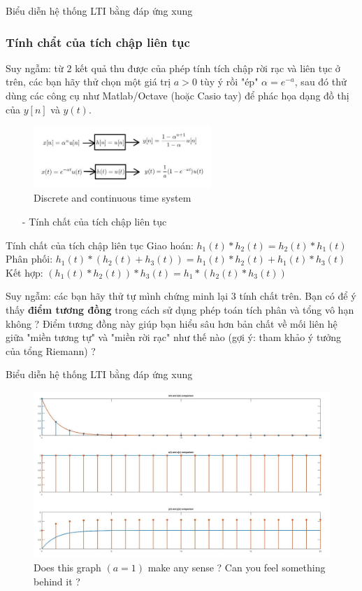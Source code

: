 \documentclass[8pt]{beamer}
\begin{document}
\begin{frame}{Biểu diễn hệ thống LTI bằng đáp ứng xung}
\subsubsection{Tính chẩt của tích chập liên tục}
Suy ngẫm: từ $2$ kết quả thu được của phép tính tích chập rời rạc và liên tục ở trên, các bạn hãy thử chọn một giá trị $a>0$ tùy ý rồi "ép" $\alpha=e^{-a}$, sau đó thử dùng các công cụ như Matlab/Octave (hoặc Casio tay) để phác họa dạng đồ thị của $y[n]$ và $y(t)$.

\begin{figure}[h]
			\includegraphics[width=0.6\textwidth]{result.jpg}
			\caption{Discrete and continuous time system}\label{fig:re9}
		\end{figure}
\begin{itemize}
	\item[-] Tính chất của tích chập liên tục
\end{itemize}
\begin{block}{Tính chất của tích chập liên tục}
	Giao hoán: $h_{1}(t)*h_{2}(t)=h_{2}(t)*h_{1}(t)$\\
	Phân phối: $h_{1}(t)*(h_{2}(t)+h_{3}(t))=h_{1}(t)*h_{2}(t)+h_{1}(t)*h_{3}(t)$\\
	Kết hợp: $(h_{1}(t)*h_{2}(t))*h_{3}(t)=h_{1}*(h_{2}(t)*h_{3}(t))$\\
\end{block}
Suy ngẫm: các bạn hãy thử tự mình chứng minh lại $3$ tính chất trên. Bạn có để ý thấy \textbf{điểm tương đồng} trong cách sử dụng phép toán tích phân và tổng vô hạn không ? Điểm tương đồng này giúp bạn hiểu sâu hơn bản chất về mối liên hệ giữa "miền tương tự" và "miền rời rạc" như thế nào (gợi ý: tham khảo ý tưởng của tổng Riemann) ?
\end{frame}
\begin{frame}{Biểu diễn hệ thống LTI bằng đáp ứng xung}
\begin{figure}[h]
			\includegraphics[width=1\textwidth]{test.jpg}
			\caption{Does this graph $(a=1)$ make any sense ? Can you feel something behind it ?}\label{fig:re10}
		\end{figure}
\end{frame}
\end{document}
